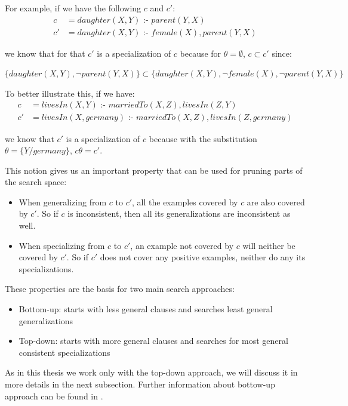 For example, if we have the following $c$ and $c'$:
\begin{align*}
  c &= daughter(X,Y) \text{ :- } parent(Y,X) \\
  c'&= daughter(X,Y )\text{ :- } female(X),parent(Y,X)
\end{align*}

we know that for that $c'$ is a specialization of $c$ because for $\theta=\emptyset$, $c \subset c'$ since:
\begin{center}
$\{daughter(X,Y),\neg parent(Y,X)\} \subset \{daughter(X,Y),\neg female(X),\neg parent(Y,X)\}$ 
\end{center}

To better illustrate this, if we have:
\begin{align*}
  c &= livesIn(X,Y) \text{ :- } marriedTo(X,Z),livesIn(Z,Y)\\
  c'&=livesIn(X,germany) \text{ :- } marriedTo(X,Z),livesIn(Z,germany)
\end{align*}

we know that $c'$ is a specialization of $c$ because with the substitution $\theta=\{Y/germany\}$, $c\theta=c'$.

This notion gives us an important property that can be used for pruning parts of the search space:

\begin{itemize}
 \item When generalizing from $c$ to $c'$, all the examples covered by $c$ are also covered by $c'$. So if $c$ is
inconsistent, then all its generalizations are inconsistent as well.
  \item When specializing from $c$ to $c'$, an example not covered by $c$ will neither be covered by $c'$. So if $c'$
does not cover any positive examples, neither do any its specializations.
\end{itemize}

These properties are the basis for two main search approaches:

\begin{itemize}
 \item Bottom-up: starts with less general clauses and searches least general generalizations
 \item Top-down: starts with more general clauses and searches for most general consistent specializations
\end{itemize}

As in this thesis we work only with the top-down approach, we will discuss it in more details in the next subsection.
Further information about bottow-up approach can be found in \citet{DBLP:journals/ml/LavracD96}.

